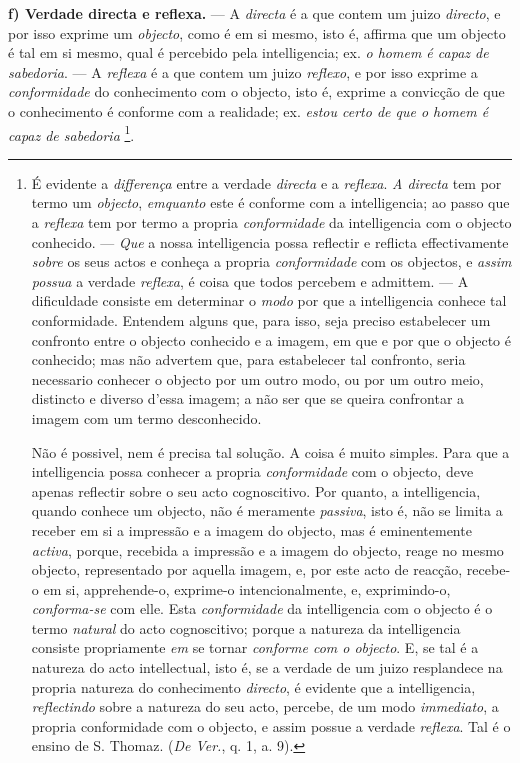 \textbf{f) Verdade directa e reflexa.} --- A \emph{directa} é a que contem um juizo \emph{directo}, e por isso exprime um \emph{objecto}, como é em si mesmo, isto é, affirma que um objecto é tal em si mesmo, qual é percebido pela intelligencia; ex. \emph{o homem é capaz de sabedoria}. --- A \emph{reflexa} é a que contem um juizo \emph{reflexo}, e por isso exprime a \emph{conformidade} do conhecimento com o objecto, isto é, exprime a convicção de que o conhecimento é conforme com a realidade; ex. \emph{estou certo de que o homem é capaz de sabedoria} \footnote{É evidente a \emph{differença} entre a verdade \emph{directa} e a \emph{reflexa}. \emph{A directa} tem por termo um \emph{objecto}, \emph{emquanto} este é conforme com a intelligencia; ao passo que a \emph{reflexa} tem por termo a propria \emph{conformidade} da intelligencia com o objecto conhecido. --- \emph{Que} a nossa intelligencia possa reflectir e reflicta effectivamente \emph{sobre} os seus actos e conheça a propria \emph{conformidade} com os objectos, e \emph{assim possua} a verdade \emph{reflexa}, é coisa que todos percebem e admittem. --- A dificuldade consiste em determinar o \emph{modo} por que a intelligencia conhece tal conformidade. Entendem alguns que, para isso, seja preciso estabelecer um confronto entre o objecto conhecido e a imagem, em que e por que o objecto é conhecido; mas não advertem que, para estabelecer tal confronto, seria necessario conhecer o objecto por um outro modo, ou por um outro meio, distincto e diverso d'essa imagem; a não ser que se queira confrontar a imagem com um termo desconhecido.\par Não é possivel, nem é precisa tal solução. A coisa é muito simples. Para que a intelligencia possa conhecer a propria \emph{conformidade} com o objecto, deve apenas reflectir sobre o seu acto cognoscitivo. Por quanto, a intelligencia, quando conhece um objecto, não é meramente \emph{passiva}, isto é, não se limita a receber em si a impressão e a imagem do objecto, mas é eminentemente \emph{activa}, porque, recebida a impressão e a imagem do objecto, reage no mesmo objecto, representado por aquella imagem, e, por este acto de reacção, recebe-o em si, apprehende-o, exprime-o intencionalmente, e, exprimindo-o, \emph{conforma-se} com elle. Esta \emph{conformidade} da intelligencia com o objecto é o termo \emph{natural} do acto cognoscitivo; porque a natureza da intelligencia consiste propriamente \emph{em} se tornar \emph{conforme com o objecto}. E, se tal é a natureza do acto intellectual, isto é, se a verdade de um juizo resplandece na propria natureza do conhecimento \emph{directo}, é evidente que a intelligencia, \emph{reflectindo} sobre a natureza do seu acto, percebe, de um modo \emph{immediato}, a propria conformidade com o objecto, e assim possue a verdade \emph{reflexa}. Tal é o ensino de S. Thomaz. (\emph{De Ver.}, q. 1, a. 9).}.


